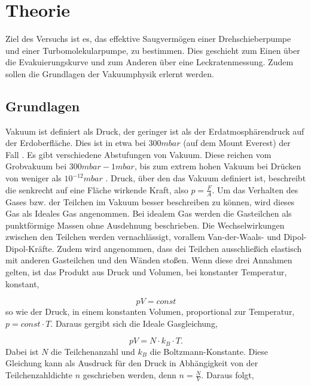 \section{Theorie}
\label{sec:Theorie}
Ziel des Versuchs ist es, das effektive Saugvermögen einer Drehschieberpumpe und einer Turbomolekularpumpe, zu bestimmen.
Dies geschieht zum Einen über die Evakuierungskurve und zum Anderen über eine Leckratenmessung.
Zudem sollen die Grundlagen der Vakuumphysik erlernt werden.


\subsection{Grundlagen}
\label{sec:Grundlagen}
Vakuum ist definiert als Druck, der geringer ist als der Erdatmosphärendruck auf der Erdoberfläche.
Dies ist in etwa bei $300 mbar$ (auf dem Mount Everest) der Fall \cite{Pfeiffer, S.9}.
Es gibt verschiedene Abstufungen von Vakuum. Diese reichen vom Grobvakuum bei $300 mbar - 1 mbar$, bis zum 
extrem hohen Vakuum bei Drücken von weniger als $10^{-12} mbar$ \cite{Pfeiffer, S.10}.
Druck, über den das Vakuum definiert ist, beschreibt die senkrecht auf eine Fläche wirkende Kraft, also $p = \frac{F}{A}$.
Um das Verhalten des Gases bzw. der Teilchen im Vakuum besser beschreiben zu können, wird dieses Gas als Ideales Gas angenommen.
Bei idealem Gas werden die Gasteilchen als punktförmige Massen ohne Ausdehnung beschrieben. 
Die Wechselwirkungen zwischen den Teilchen werden vernachlässigt, vorallem Van-der-Waals- und Dipol-Dipol-Kräfte.
Zudem wird angenommen, dass dei Teilchen ausschließich elastisch mit anderen Gasteilchen und den Wänden stoßen.
Wenn diese drei Annahmen gelten, ist das Produkt aus Druck und Volumen, bei konstanter Temperatur, konstant, 

    \begin{equation}
    \label{equ:0}
        pV = const 
    \end{equation}
so wie der Druck, in einem konstanten Volumen, proportional zur Temperatur, $p = const \cdot T$.
Daraus gergibt sich die Ideale Gasgleichung,

    \begin{equation}
    \label{equ:1}
        pV = N \cdot k_B \cdot T.
    \end{equation}
Dabei ist $N$ die Teilchenanzahl und $k_B$ die Boltzmann-Konstante.
Diese Gleichung kann als Ausdruck für den Druck in Abhängigkeit von der Teilchenzahldichte $n$ geschrieben werden, 
denn $n = \frac{N}{V}$.
Daraus folgt,

